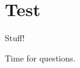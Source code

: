 \documentclass{beamer}
\begin{document}
    \section{Test}

    \begin{frame}
        Stuff!
    \end{frame}

    \appendix
    \begin{frame}
        \Huge
        Time for questions.
    \end{frame}
\end{document}
